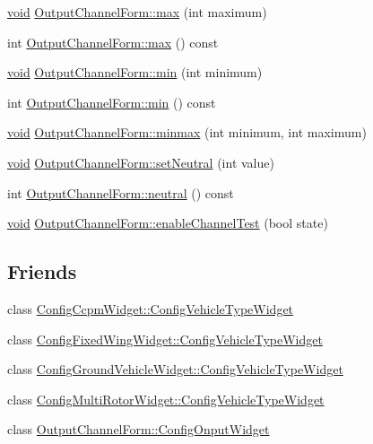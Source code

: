 \begin{DoxyCompactItemize}
\item 
\hyperlink{group___u_a_v_objects_plugin_ga444cf2ff3f0ecbe028adce838d373f5c}{void} \hyperlink{group___config_plugin_gadeee570b83855701e61945279673cd59}{\-Output\-Channel\-Form\-::max} (int maximum)
\item 
int \hyperlink{group___config_plugin_gac5e9e5be40f804ee632232a3e980ee0d}{\-Output\-Channel\-Form\-::max} () const 
\item 
\hyperlink{group___u_a_v_objects_plugin_ga444cf2ff3f0ecbe028adce838d373f5c}{void} \hyperlink{group___config_plugin_gac5d132282f1a4c2233999a1041995124}{\-Output\-Channel\-Form\-::min} (int minimum)
\item 
int \hyperlink{group___config_plugin_ga2086e4a8bc1572b98114b0272313ed2a}{\-Output\-Channel\-Form\-::min} () const 
\item 
\hyperlink{group___u_a_v_objects_plugin_ga444cf2ff3f0ecbe028adce838d373f5c}{void} \hyperlink{group___config_plugin_gad231eb8bdcfa798ec5246049fdd07ae4}{\-Output\-Channel\-Form\-::minmax} (int minimum, int maximum)
\item 
\hyperlink{group___u_a_v_objects_plugin_ga444cf2ff3f0ecbe028adce838d373f5c}{void} \hyperlink{group___config_plugin_ga46c4da3a30cc25c1178b9f9a125c8660}{\-Output\-Channel\-Form\-::set\-Neutral} (int value)
\item 
int \hyperlink{group___config_plugin_ga7ec2288bf27bf15dfb962c5e965d008e}{\-Output\-Channel\-Form\-::neutral} () const 
\item 
\hyperlink{group___u_a_v_objects_plugin_ga444cf2ff3f0ecbe028adce838d373f5c}{void} \hyperlink{group___config_plugin_ga306e95f301ee75290ea828d4c7e04a60}{\-Output\-Channel\-Form\-::enable\-Channel\-Test} (bool state)
\end{DoxyCompactItemize}
\subsection*{\-Friends}
\begin{DoxyCompactItemize}
\item 
class \hyperlink{group___config_plugin_gaf1f904d5df6619518f3228b2d5d238d0}{\-Config\-Ccpm\-Widget\-::\-Config\-Vehicle\-Type\-Widget}
\item 
class \hyperlink{group___config_plugin_gaf1f904d5df6619518f3228b2d5d238d0}{\-Config\-Fixed\-Wing\-Widget\-::\-Config\-Vehicle\-Type\-Widget}
\item 
class \hyperlink{group___config_plugin_gaf1f904d5df6619518f3228b2d5d238d0}{\-Config\-Ground\-Vehicle\-Widget\-::\-Config\-Vehicle\-Type\-Widget}
\item 
class \hyperlink{group___config_plugin_gaf1f904d5df6619518f3228b2d5d238d0}{\-Config\-Multi\-Rotor\-Widget\-::\-Config\-Vehicle\-Type\-Widget}
\item 
class \hyperlink{group___config_plugin_ga92a68401074780ed6cadf27f127892e3}{\-Output\-Channel\-Form\-::\-Config\-Onput\-Widget}
\end{DoxyCompactItemize}


